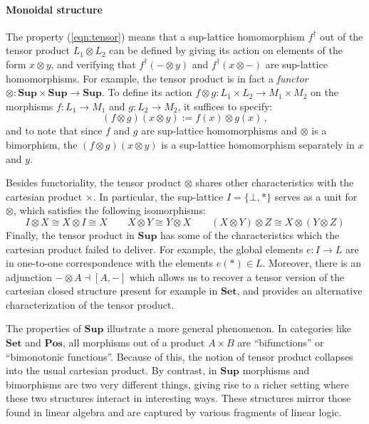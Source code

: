 \documentclass[11pt,oneside,draft]{book}
\theoremstyle{definition}
\begin{document}

\paragraph{Monoidal structure}

The property (\ref{eqn:tensor}) means that
a sup-lattice homomorphism $f^\dagger$
out of the tensor product $L_1 \otimes L_2$
can be defined by giving its action on
elements of the form $x \otimes y$,
and verifying that
$f^\dagger(- \otimes y)$ and
$f^\dagger(x \otimes -)$ 
are sup-lattice homomorphisms.
For example,
the tensor product is in fact a \emph{functor}
${\otimes} :
 \mathbf{Sup} \times \mathbf{Sup} \rightarrow \mathbf{Sup}$.
To define its action
$f \otimes g : L_1 \times L_2 \rightarrow M_1 \times M_2$
on the morphisms
$f : L_1 \rightarrow M_1$ and
$g : L_2 \rightarrow M_2$,
it suffices to specify:
\[
  (f \otimes g)(x \otimes y) := f(x) \otimes g(x)
  \,,
\]
and to note that since $f$ and $g$ are sup-lattice homomorphisms
and $\otimes$ is a bimorphism,
the $(f \otimes g)(x \otimes y)$
is a sup-lattice homomorphism separately in $x$ and $y$.

Besides functoriality,
the tensor product $\otimes$ shares other characteristics
with the cartesian product $\times$.
In particular,
the sup-lattice $I = \{ \bot, * \}$ 
serves as a unit for $\otimes$,
which satisfies the following isomorphisms:
\[
  I \otimes X \cong X \otimes I \cong X
  \qquad
  X \otimes Y \cong Y \otimes X
  \qquad
  (X \otimes Y) \otimes Z \cong X \otimes (Y \otimes Z)
\]
Finally,
the tensor product in $\mathbf{Sup}$
has some of the characteristics
which the cartesian product failed to deliver.
For example,
the global elements $e : I \rightarrow L$
are in one-to-one correspondence
with the elements $e(*) \in L$.
Moreover,
there is an adjunction
$- \otimes A \dashv [A, -]$
which allows us to recover a tensor version
of the cartesian closed structure
present for example in $\mathbf{Set}$,
and provides an alternative characterization
of the tensor product.

The properties of $\mathbf{Sup}$
illustrate a more general phenomenon.
In categories like $\mathbf{Set}$ and $\mathbf{Pos}$,
all morphisms out of a product $A \times B$
are ``bifunctions'' or ``bimonotonic functions''.
Because of this,
the notion of tensor product collapses into
the usual cartesian product.
By contrast,
in $\mathbf{Sup}$ morphisms and bimorphisms
are two very different things,
giving rise to a richer setting
where these two structures
interact in interesting ways.
These structures mirror those found in linear algebra
and are captured by various fragments of linear logic.
\end{document}
